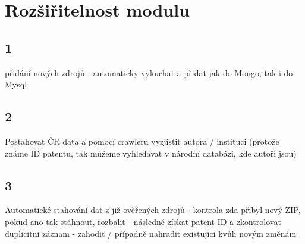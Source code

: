 \chapter{Rozšiřitelnost modulu}
\section{1}
přidání nových zdrojů - automaticky vykuchat a přidat jak do Mongo, tak i do Mysql
\section{2}
Postahovat ČR data a pomocí crawleru vyzjistit autora / instituci (protože známe ID patentu, tak můžeme vyhledávat v národní databázi, kde autoři jsou)
\section{3}
Automatické stahování dat z již ověřených zdrojů - kontrola zda přibyl nový ZIP, pokud ano tak stáhnout, rozbalit - následně získat patent ID a zkontrolovat duplicitní záznam - zahodit / případně nahradit existující kvůli novým změnám